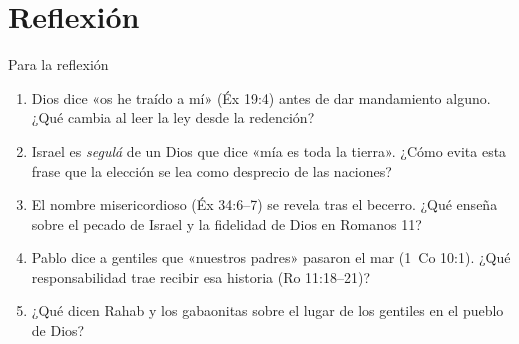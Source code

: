 \documentclass[hyperref={bookmarks=false},aspectratio=169]{beamer}
\begin{document}
\section{Reflexión}
\begin{frame}{Para la reflexión}
\footnotesize
\begin{enumerate}\setlength{\itemsep}{6pt}
\item Dios dice «os he traído a mí» (Éx 19:4) antes de dar mandamiento alguno. ¿Qué cambia al leer la ley desde la redención?
\item Israel es \emph{segulá} de un Dios que dice «mía es toda la tierra». ¿Cómo evita esta frase que la elección se lea como desprecio de las naciones?
\item El nombre misericordioso (Éx 34:6--7) se revela tras el becerro. ¿Qué enseña sobre el pecado de Israel y la fidelidad de Dios en Romanos 11?
\item Pablo dice a gentiles que «nuestros padres» pasaron el mar (1~Co 10:1). ¿Qué responsabilidad trae recibir esa historia (Ro 11:18--21)?
\item ¿Qué dicen Rahab y los gabaonitas sobre el lugar de los gentiles en el pueblo de Dios?
\end{enumerate}
\end{frame}

\end{document}
